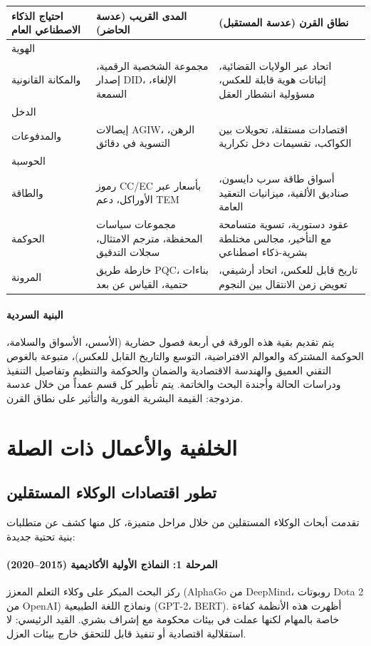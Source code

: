 \documentclass[11pt]{article}
\begin{document}
\begin{longtable}{@{}p{}p{}p{}@{}}
\toprule
\textbf{احتياج الذكاء الاصطناعي العام} & \textbf{المدى القريب (عدسة الحاضر)} & \textbf{نطاق القرن (عدسة المستقبل)} \\\midrule
الهوية \\ والمكانة القانونية & مجموعة الشخصية الرقمية، إصدار DID، الإلغاء، السمعة & اتحاد عبر الولايات القضائية، إثباتات هوية قابلة للعكس، مسؤولية انشطار العقل \\
الدخل \\ والمدفوعات & إيصالات AGIW، الرهن، التسوية في دقائق & اقتصادات مستقلة، تحويلات بين الكواكب، تقسيمات دخل تكرارية \\
الحوسبة \\ والطاقة & رموز CC/EC بأسعار عبر الأوراكل، دعم TEM & أسواق طاقة سرب دايسون، صناديق الألفية، ميزانيات التعقيد العامة \\
الحوكمة & مجموعات سياسات المحفظة، مترجم الامتثال، سجلات التدقيق & عقود دستورية، تسوية متسامحة مع التأخير، مجالس مختلطة بشرية-ذكاء اصطناعي \\
المرونة & خارطة طريق PQC، بناءات حتمية، القياس عن بعد & تاريخ قابل للعكس، اتحاد أرشيفي، تعويض زمن الانتقال بين النجوم \\\bottomrule
\end{longtable}

\paragraph{البنية السردية} يتم تقديم بقية هذه الورقة في أربعة فصول حضارية (الأسس، الأسواق والسلامة، الحوكمة المشتركة والعوالم الافتراضية، التوسع والتاريخ القابل للعكس)، متبوعة بالغوص التقني العميق والهندسة الاقتصادية والضمان والحوكمة والتنظيم وتفاصيل التنفيذ ودراسات الحالة وأجندة البحث والخاتمة. يتم تأطير كل قسم عمداً من خلال عدسة مزدوجة: القيمة البشرية الفورية والتأثير على نطاق القرن.

\section{الخلفية والأعمال ذات الصلة}
\subsection{تطور اقتصادات الوكلاء المستقلين}
تقدمت أبحاث الوكلاء المستقلين من خلال مراحل متميزة، كل منها كشف عن متطلبات بنية تحتية جديدة:

\paragraph{المرحلة 1: النماذج الأولية الأكاديمية (2015--2020)} ركز البحث المبكر على وكلاء التعلم المعزز (AlphaGo من DeepMind، روبوتات Dota 2 من OpenAI) ونماذج اللغة الطبيعية (GPT-2، BERT). أظهرت هذه الأنظمة كفاءة خاصة بالمهام لكنها عملت في بيئات محكومة مع إشراف بشري. القيد الرئيسي: لا استقلالية اقتصادية أو تنفيذ قابل للتحقق خارج بيئات العزل.
\end{document}
